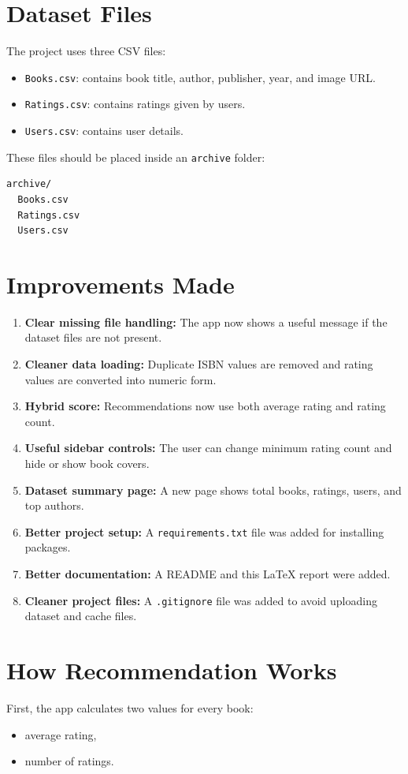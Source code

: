\documentclass[12pt]{article}
\begin{document}
\section{Dataset Files}
The project uses three CSV files:
\begin{itemize}[leftmargin=*]
    \item \texttt{Books.csv}: contains book title, author, publisher, year, and image URL.
    \item \texttt{Ratings.csv}: contains ratings given by users.
    \item \texttt{Users.csv}: contains user details.
\end{itemize}

These files should be placed inside an \texttt{archive} folder:
\begin{verbatim}
archive/
  Books.csv
  Ratings.csv
  Users.csv
\end{verbatim}

\section{Improvements Made}
\begin{enumerate}[leftmargin=*]
    \item \textbf{Clear missing file handling:} The app now shows a useful message if the dataset files are not present.
    \item \textbf{Cleaner data loading:} Duplicate ISBN values are removed and rating values are converted into numeric form.
    \item \textbf{Hybrid score:} Recommendations now use both average rating and rating count.
    \item \textbf{Useful sidebar controls:} The user can change minimum rating count and hide or show book covers.
    \item \textbf{Dataset summary page:} A new page shows total books, ratings, users, and top authors.
    \item \textbf{Better project setup:} A \texttt{requirements.txt} file was added for installing packages.
    \item \textbf{Better documentation:} A README and this LaTeX report were added.
    \item \textbf{Cleaner project files:} A \texttt{.gitignore} file was added to avoid uploading dataset and cache files.
\end{enumerate}

\section{How Recommendation Works}
First, the app calculates two values for every book:
\begin{itemize}[leftmargin=*]
    \item average rating,
    \item number of ratings.
\end{itemize}
\end{document}
